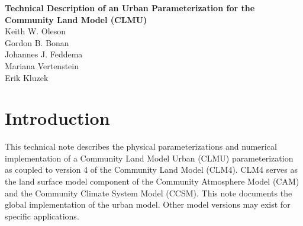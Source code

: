 \documentclass[12pt,authoryear]{elsarticle}
\numberwithin{equation}{section} %
\begin{document}
	
\begin{titlepage}
\begin{flushright}
\vfill
\Huge{\textbf{Technical Description of an Urban Parameterization for the Community Land Model (CLMU)}} \\
\vfill
\large Keith W. Oleson \\
\large Gordon B. Bonan \\
\large Johannes J. Feddema \\
\large Mariana Vertenstein \\
\large Erik Kluzek \\
\vfill
\end{flushright}
\end{titlepage}

\tableofcontents
\newpage
\listoffigures
\newpage
\listoftables
\newpage

\section{Introduction}
\label{sec:introduction}
This technical note describes the physical parameterizations and numerical implementation of a Community Land Model Urban (CLMU) parameterization as coupled to version 4 of the Community Land Model (CLM4). CLM4 serves as the land surface model component of the Community Atmosphere Model (CAM) and the Community Climate System Model (CCSM). This note documents the global implementation of the urban model. Other model versions may exist for specific
applications.
\end{document}
